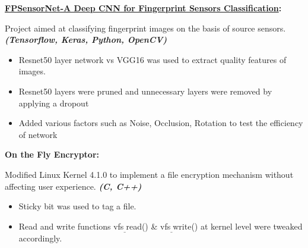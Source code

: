 \documentclass[11pt, a4paper]{article}
\newcommand{\resumeNewItem}[3]{
  \item\small{
    \textbf{#1:}{\hfill \vspace{3pt}{#2}\\}{ #3}
  }
}
\newcommand{\resumeNewSubItem}[3]{\resumeNewItem{#1}{#2}{#3}}
\begin{document}
    \resumeNewSubItem{\href{https://github.com/deepakks1995/Fingerprint_Sensor_Classification}{FPSensorNet-A Deep CNN for Fingerprint Sensors Classification}}{(Mar 2017 - May 2017), IIT Mandi}{
        Project aimed at classifying fingerprint images on the basis of source sensors. \small{\textbf{\textit{(Tensorflow, Keras, Python, OpenCV)}}}
        \begin{itemize} 
          \item Resnet50 layer network vs VGG16 was used to extract quality features of images.
          \item Resnet50 layers were pruned and unnecessary layers were removed by applying a dropout 
          \item Added various factors such as Noise, Occlusion, Rotation to test the efficiency of network
        \end{itemize}
        
    }
    \resumeNewSubItem{On the Fly Encryptor}{ VI Semester, IIT Mandi}{
        Modified Linux Kernel 4.1.0 to implement a file encryption mechanism without affecting user experience. \small{\textbf{\textit{(C, C++)}}}
        \begin{itemize} 
          \item Sticky bit was used to tag a file. 
          \item Read and write functions vfs$_{\_}$read() \& vfs$_{\_}$write() at kernel level were tweaked accordingly.
           \end{itemize}
       
    }
\end{document}

